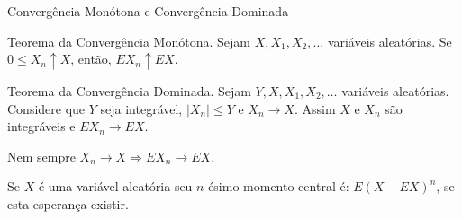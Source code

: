 \begin{frame}{Convergência Monótona e Convergência Dominada}
%
%
%
\begin{teo}{Teorema da Convergência Monótona.} Sejam
$X,X_1,X_2,\ldots$ variáveis aleatórias. Se $0\leq X_n\uparrow X$,
então, $EX_n\uparrow EX$. \end{teo}

\begin{teo}{Teorema da Convergência Dominada.} Sejam
$Y,X,X_1,X_2,\ldots$ variáveis aleatórias. Considere que $Y$ seja
integrável, $|X_n|\leq Y$ e $X_n\rightarrow X$. Assim $X$ e $X_n$
são integráveis e $EX_n\rightarrow EX$. \end{teo}
%
%
\begin{nota} Nem sempre $X_n\rightarrow X\Rightarrow
EX_n\rightarrow EX$.
\end{nota}
%
%
%
%
%
%
\begin{defi}
Se $X$ é uma variável aleatória seu $n$-ésimo momento central é:
$E(X-EX)^n$, se esta esperança existir.
\end{defi}
\end{frame}
%
